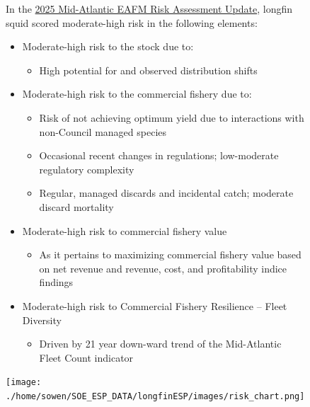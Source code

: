 \documentclass[
  8.5pt,
  letterpaper,
]{article}
\providecommand{\tightlist}{%
  \setlength{\itemsep}{0pt}\setlength{\parskip}{0pt}}\usepackage{longtable,booktabs,array}
\begin{document}
\begin{figure}
\begin{minipage}{0.40\linewidth}
\raggedright

In the
\href{https://static1.squarespace.com/static/511cdc7fe4b00307a2628ac6/t/67d45b1680e8654ecaf1b98e/1741970199497/b_Draft+MAB_RiskAssess_2025.pdf}{2025
Mid-Atlantic EAFM Risk Assessment Update}, longfin squid scored
moderate-high risk in the following elements:

\begin{itemize}
\tightlist
\item
  Moderate-high risk to the stock due to:

  \begin{itemize}
  \tightlist
  \item
    High potential for and observed distribution shifts\\
  \end{itemize}
\item
  Moderate-high risk to the commercial fishery due to:

  \begin{itemize}
  \tightlist
  \item
    Risk of not achieving optimum yield due to interactions with
    non-Council managed species
  \item
    Occasional recent changes in regulations; low-moderate regulatory
    complexity
  \item
    Regular, managed discards and incidental catch; moderate discard
    mortality
  \end{itemize}
\item
  Moderate-high risk to commercial fishery value

  \begin{itemize}
  \tightlist
  \item
    As it pertains to maximizing commercial fishery value based on net
    revenue and revenue, cost, and profitability indice findings
  \end{itemize}
\item
  Moderate-high risk to Commercial Fishery Resilience -- Fleet Diversity

  \begin{itemize}
  \tightlist
  \item
    Driven by 21 year down-ward trend of the Mid-Atlantic Fleet Count
    indicator
  \end{itemize}
\end{itemize}

\vspace{0.5cm}

\texttt{[image: ./home/sowen/SOE\_ESP\_DATA/longfinESP/images/risk\_chart.png]}

\end{minipage}%

\end{figure}%
\end{document}
